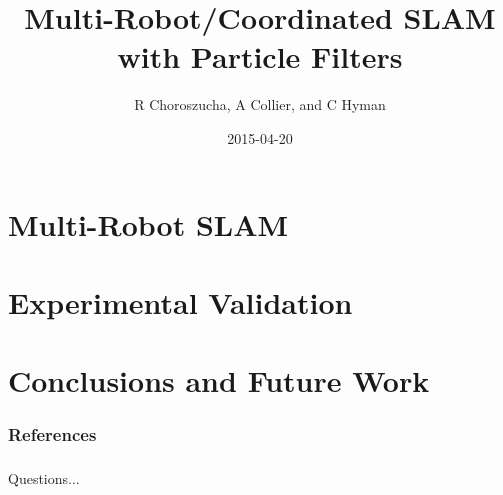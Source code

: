 \documentclass[14pt]{beamer}
\title[EECS 568]{Multi-Robot/Coordinated SLAM with Particle Filters} %
\author{R Choroszucha, A Collier, and C Hyman}
\date{2015-04-20} %
\begin{document}
\begin{frame}
\titlepage %
\end{frame}




\section{Multi-Robot SLAM}



\section{Experimental Validation}




\section{Conclusions and Future Work}



%        
%        

\begin{frame}[t]
\nocite{*}
        \frametitle{References}
        \tiny{}
\end{frame}

\begin{frame}
\frametitle{}
\begin{center}
{ \Huge Questions...}
\end{center}
\end{frame}

%
%
%
\end{document}

